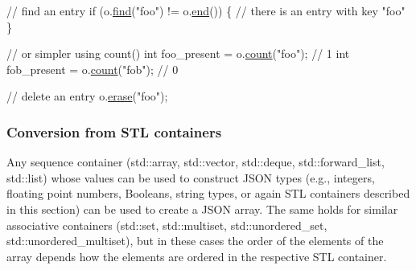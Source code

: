 \begin{DoxyCode}
\textcolor{comment}{// find an entry}
\textcolor{keywordflow}{if} (o.\hyperlink{a00025_affe7e160e7bb06eed83c8b437af4692f}{find}(\textcolor{stringliteral}{"foo"}) != o.\hyperlink{a00025_a12ccf14d39ddae52f6c7e126105a230b}{end}()) \{
  \textcolor{comment}{// there is an entry with key "foo"}
\}

\textcolor{comment}{// or simpler using count()}
\textcolor{keywordtype}{int} foo\_present = o.\hyperlink{a00025_a51b0036310d8aa5858fecc0d91127f27}{count}(\textcolor{stringliteral}{"foo"}); \textcolor{comment}{// 1}
\textcolor{keywordtype}{int} fob\_present = o.\hyperlink{a00025_a51b0036310d8aa5858fecc0d91127f27}{count}(\textcolor{stringliteral}{"fob"}); \textcolor{comment}{// 0}

\textcolor{comment}{// delete an entry}
o.\hyperlink{a00025_a45e789042a23138eba2b69f34df9fc45}{erase}(\textcolor{stringliteral}{"foo"});
\end{DoxyCode}


\subsubsection*{Conversion from S\+TL containers}

Any sequence container ({\ttfamily std\+::array}, {\ttfamily std\+::vector}, {\ttfamily std\+::deque}, {\ttfamily std\+::forward\+\_\+list}, {\ttfamily std\+::list}) whose values can be used to construct J\+S\+ON types (e.\+g., integers, floating point numbers, Booleans, string types, or again S\+TL containers described in this section) can be used to create a J\+S\+ON array. The same holds for similar associative containers ({\ttfamily std\+::set}, {\ttfamily std\+::multiset}, {\ttfamily std\+::unordered\+\_\+set}, {\ttfamily std\+::unordered\+\_\+multiset}), but in these cases the order of the elements of the array depends how the elements are ordered in the respective S\+TL container.


